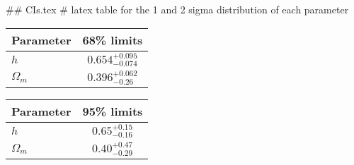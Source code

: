 ## CIs.tex
# latex table for the 1 and 2 sigma distribution of each parameter

\begin{tabular} { l  c}
 Parameter &  68\% limits\\
\hline
{\boldmath$h              $} & $0.654^{+0.095}_{-0.074}   $\\
{\boldmath$\Omega_m       $} & $0.396^{+0.062}_{-0.26}    $\\
\hline
\end{tabular}

\begin{tabular} { l  c}
 Parameter &  95\% limits\\
\hline
{\boldmath$h              $} & $0.65^{+0.15}_{-0.16}      $\\
{\boldmath$\Omega_m       $} & $0.40^{+0.47}_{-0.29}      $\\
\hline
\end{tabular}
